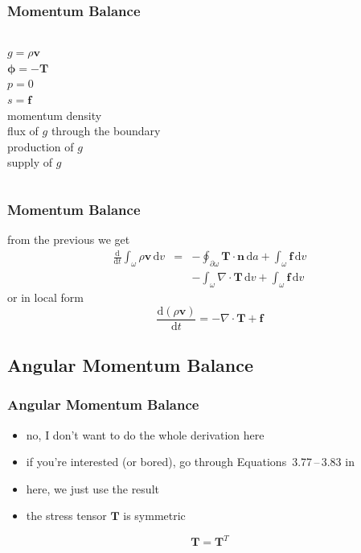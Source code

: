 \documentclass[hide notes,intlimits]{beamer}
\begin{document}
\begin{frame}
  \frametitle{Momentum Balance}
  \begin{columns}
    \column[C]{2cm}
    $g = \rho \mathbf{v}$ \\
    $\boldsymbol{\phi} = - \mathbf{T} $ \\
    $p = 0$ \\
    $s = \mathbf{f}$ \\
    \column[C]{6cm}
      momentum density \\
      flux of $g$ through the boundary \\
      production of $g$ \\
      supply of $g$
    \end{columns}
\end{frame}

\begin{frame}
  \frametitle{Momentum Balance}
  from the previous we get
  \begin{eqnarray}
    \frac{\text{d}}{\text{d} t} \int_{\omega} \rho \mathbf{v}\, \text{d} v & = & - \oint_{\partial \omega} \mathbf{T} \cdot \mathbf{n} \, \text{d} a + \int_{\omega} \mathbf{f} \, \text{d} v \\
    & & -\int_{\omega} \nabla \cdot \mathbf{T}\, \text{d} v + \int_{\omega} \mathbf{f} \, \text{d} v
  \end{eqnarray} or in local form
  \begin{equation}
    \frac{\text{d}\left(\rho\mathbf{v}\right)}{\text{d} t} = -\nabla \cdot \mathbf{T} + \mathbf{f}
  \end{equation}
\end{frame}


\subsection{Angular Momentum Balance}

\begin{frame}
  \frametitle{Angular Momentum Balance}
  \begin{itemize}
  \item  no, I don't want to do the whole derivation here
  \item if you're interested (or bored), go through Equations~3.77\,--\,3.83  in \cite{GreveBlatter_disg}
  \item here, we just use the result
  \item the stress tensor $\mathbf{T}$ is \alert{symmetric}
  \end{itemize}
  \begin{equation}
    \mathbf{T} = \mathbf{T}^{T}
 \end{equation}
\end{frame}
\end{document}
